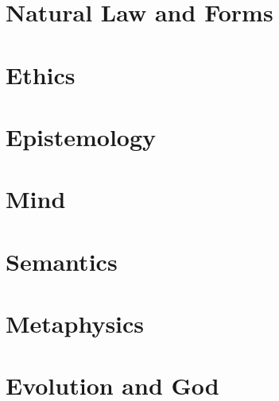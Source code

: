 \def\mychapter{I}

\chapter{Natural Law and Forms}\label{ch:intro}

\chaptertail 


\def\mychapter{II}

\chapter{Ethics}\label{ch:intro}
\chaptertail 

\def\mychapter{III}

\chapter{Epistemology}\label{ch:epistemology}
\chaptertail 

\def\mychapter{IV}

\chapter{Mind}\label{ch:mind}
\chaptertail 

\def\mychapter{V}

\chapter{Semantics}\label{ch:semantics}
\chaptertail 

\def\mychapter{VI}

\chapter{Metaphysics}\label{ch:metaphysics}
\chaptertail 

\def\mychapter{VII}

\chapter{Evolution and God}\label{ch:God}
\chaptertail 


